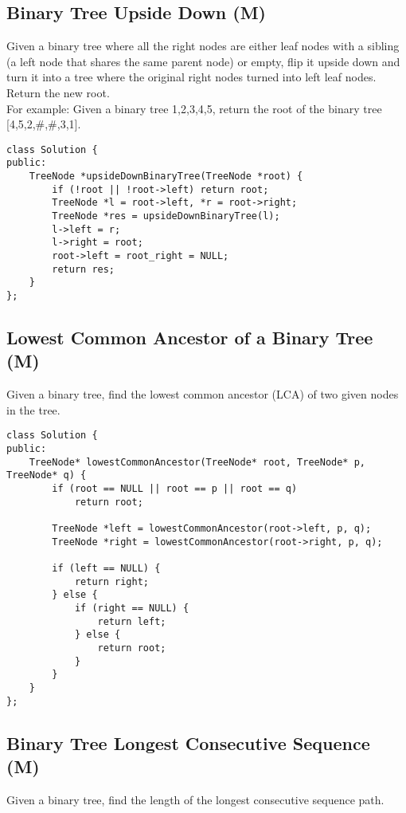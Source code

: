 \subsection{Binary Tree Upside Down (M)}
Given a binary tree where all the right nodes are either leaf nodes with a sibling (a left node that shares the same parent node) or empty, flip it upside down and turn it into a tree where the original right nodes turned into left leaf nodes. Return the new root.\\

For example:
Given a binary tree {1,2,3,4,5}, return the root of the binary tree [4,5,2,\#,\#,3,1]. \\

\begin{lstlisting}
class Solution {
public:
    TreeNode *upsideDownBinaryTree(TreeNode *root) {
        if (!root || !root->left) return root;
        TreeNode *l = root->left, *r = root->right;
        TreeNode *res = upsideDownBinaryTree(l);
        l->left = r;
        l->right = root;
        root->left = root_right = NULL;
        return res;
    }
};
\end{lstlisting}


\subsection{Lowest Common Ancestor of a Binary Tree (M)}
Given a binary tree, find the lowest common ancestor (LCA) of two given nodes in the tree. \\

\begin{lstlisting}
class Solution {
public:
    TreeNode* lowestCommonAncestor(TreeNode* root, TreeNode* p, TreeNode* q) {
        if (root == NULL || root == p || root == q)
            return root;
        
        TreeNode *left = lowestCommonAncestor(root->left, p, q);
        TreeNode *right = lowestCommonAncestor(root->right, p, q);
        
        if (left == NULL) {
            return right;
        } else {
            if (right == NULL) {
                return left;
            } else {
                return root;
            }
        }
    }
};
\end{lstlisting}


\subsection{Binary Tree Longest Consecutive Sequence (M)}
Given a binary tree, find the length of the longest consecutive sequence path.\\

